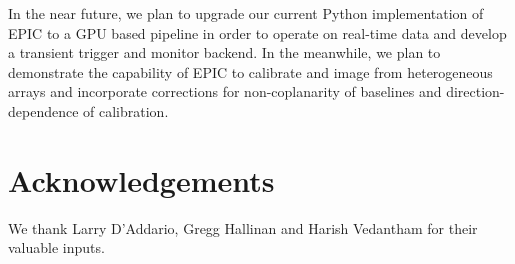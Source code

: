\documentclass[a4paper,fleqn,usenatbib]{../mnras}
\begin{document}
In the near future, we plan to upgrade our current Python implementation 
of EPIC to a GPU based pipeline in order to operate on real-time data and 
develop a transient trigger and monitor backend. In the meanwhile, we plan 
to demonstrate the capability of EPIC to calibrate and image from heterogeneous 
arrays and incorporate corrections for non-coplanarity of baselines and 
direction-dependence of calibration. 

\section*{Acknowledgements}

We thank Larry D'Addario, Gregg Hallinan and Harish Vedantham for their valuable 
inputs.















\bsp	%
\label{lastpage}
\end{document}
